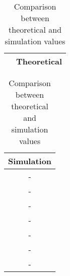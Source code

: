 \begin{table}[ht!]
  \centering
\begin{minipage}[b]{0.59\textwidth}
    \flushright
    \begin{tabular}{|c|c|}
      \hline    
       & \textbf{Theoretical} \\ \hline
      
      
    \end{tabular}
\end{minipage}
\begin{minipage}[b]{0.39\textwidth}
\flushleft
   \begin{tabular}{c|}
    \hline    
    \textbf{Simulation} \\ \hline
    - \\ \hline
    - \\ \hline
    - \\ \hline
    - \\ \hline
    
    
    - \\ \hline
    - \\ \hline
    
    - \\ \hline
    
   \end{tabular}
\end{minipage}
\caption{Comparison between theoretical and simulation values}
\label{tab:comp}
\end{table}

